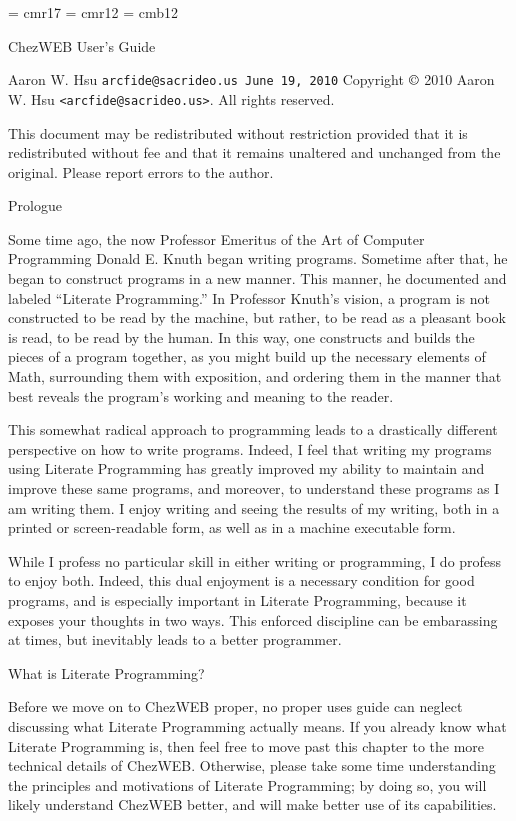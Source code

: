 

\font\titlefnt = cmr17
\font\big = cmr12
\font\bigbf = cmb12

\def\heading#1{{\bigbf\bigskip\noindent #1\par\medskip}\noindent}

\null\vskip 3in
\centerline{\titlefnt ChezWEB User's Guide}
\vskip 1in
{\center Aaron W. Hsu
\tt arcfide@sacrideo.us
June 19, 2010}
\vfill
\noindent
Copyright $\copyright$ 2010 Aaron W. Hsu {\tt <arcfide@sacrideo.us>}. All rights reserved.\par
\noindent
This document may be redistributed without restriction provided that it is redistributed without fee and that it remains unaltered and unchanged from the original. Please report errors to the author.
\vfil\break

\doublecolumns

\heading{Prologue}%
Some time ago, the now Professor Emeritus of the Art of Computer
Programming Donald E. Knuth began writing programs.  Sometime after
that, he began to construct programs in a new manner.  This manner, he
documented and labeled ``Literate Programming.'' In Professor Knuth's
vision, a program is not constructed to be read by the machine, but
rather, to be read as a pleasant book is read, to be read by the
human.  In this way, one constructs and builds the pieces of a program
together, as you might build up the necessary elements of Math,
surrounding them with exposition, and ordering them in the manner that
best reveals the program's working and meaning to the reader.

This somewhat radical approach to programming leads to a drastically
different perspective on how to write programs.  Indeed, I feel that
writing my programs using Literate Programming has greatly improved my
ability to maintain and improve these same programs, and moreover, to
understand these programs as I am writing them.  I enjoy writing and
seeing the results of my writing, both in a printed or screen-readable
form, as well as in a machine executable form.

While I profess no particular skill in either writing or programming,
I do profess to enjoy both.  Indeed, this dual enjoyment is a
necessary condition for good programs, and is especially important in
Literate Programming, because it exposes your thoughts in two ways.
This enforced discipline can be embarassing at times, but inevitably
leads to a better programmer.

\heading{What is Literate Programming?}%
Before we move on to ChezWEB proper, no proper uses guide can
neglect discussing what Literate Programming actually means.  If you
already know what Literate Programming is, then feel free to move past
this chapter to the more technical details of ChezWEB.  Otherwise,
please take some time understanding the principles and motivations of
Literate Programming; by doing so, you will likely understand ChezWEB
better, and will make better use of its capabilities.

